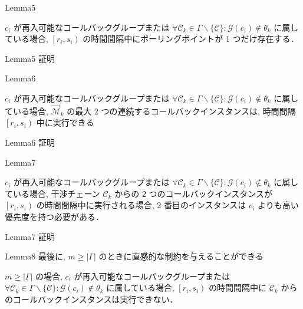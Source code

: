 \begin{frame}{Lemma5}
    \begin{lemma}[]
        $c_{i}$ が再入可能なコールバックグループまたは $\forall \mathcal{C}_{k} \in \Gamma \backslash\{\mathcal{C}\}: \mathcal{G}\left(c_{i}\right) \notin \theta_{k}$ に属している場合, $\left[r_{i}, s_{i}\right)$ の時間間隔中にポーリングポイントが 1 つだけ存在する．
    \end{lemma}
\end{frame}

\begin{frame}{Lemma5 証明}
    \todo{}
\end{frame}

\begin{frame}{Lemma6}
    \begin{lemma}[]
        $c_{i}$ が再入可能なコールバックグループまたは $\forall \mathcal{C}_{k} \in \Gamma \backslash\{\mathcal{C}\}: \mathcal{G}\left(c_{i}\right) \notin \theta_{k}$ に属している場合, $\overrightarrow{\mathcal{M}}_{k}$ の最大 2 つの連続するコールバックインスタンスは, 時間間隔 $\left[r_{i}, s_{i}\right)$ 中に実行できる
    \end{lemma}
\end{frame}

\begin{frame}{Lemma6 証明}
    \todo{}
\end{frame}

\begin{frame}{Lemma7}
    \begin{lemma}[]
        $c_{i}$ が再入可能なコールバックグループまたは $\forall \mathcal{C}_{k} \in \Gamma \backslash\{\mathcal{C}\}: \mathcal{G}\left(c_{i}\right) \notin \theta_{k}$ に属している場合, 干渉チェーン $\mathcal{C}_{k}$ からの 2 つのコールバックインスタンスが $\left[r_{i}, s_{i}\right)$ の時間間隔中に実行される場合, 2 番目のインスタンスは $c_{i}$ よりも高い優先度を持つ必要がある．
    \end{lemma}
\end{frame}

\begin{frame}{Lemma7 証明}
    \todo{}
\end{frame}

\begin{frame}{Lemma8}
    最後に, $m \geq|\Gamma|$ のときに直感的な制約を与えることができる
    \begin{lemma}[]
        $m \geq|\Gamma|$ の場合, $c_{i}$ が再入可能なコールバックグループまたは $\forall \mathcal{C}_{k} \in \Gamma \backslash\{\mathcal{C}\}: \mathcal{G}\left(c_{i}\right) \notin \theta_{k}$ に属している場合, $\left[r_{i}, s_{i}\right)$ の時間間隔中に $\mathcal{C}_{k}$ からのコールバックインスタンスは実行できない．
    \end{lemma}
\end{frame}

